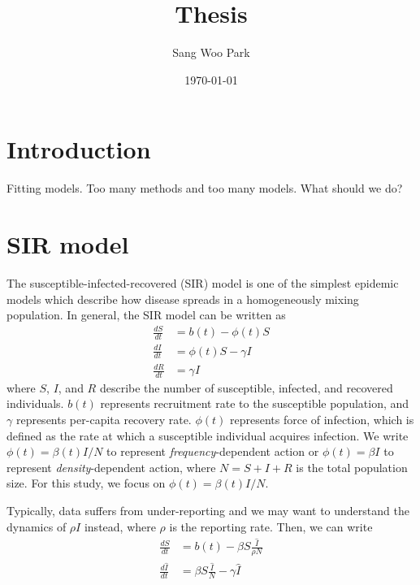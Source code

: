 \documentclass{article}
\title{Thesis}
\date{\today}
\author{Sang Woo Park}
\begin{document}
\maketitle


\section{Introduction}

Fitting models. Too many methods and too many models. What should we do?

\section{SIR model}

The susceptible-infected-recovered (SIR) model is one of the simplest epidemic models which describe how disease spreads in a homogeneously mixing population.
In general, the SIR model can be written as 
\begin{equation}
\begin{aligned}
\frac{dS}{dt} &= b(t) - \phi(t) S\\
\frac{dI}{dt} &= \phi(t) S - \gamma I\\
\frac{dR}{dt} &= \gamma I
\end{aligned}
\label{eq:sir}
\end{equation}
where $S$, $I$, and $R$ describe the number of susceptible, infected, and recovered individuals.
$b(t)$ represents recruitment rate to the susceptible population, and $\gamma$ represents per-capita recovery rate.
$\phi(t)$ represents force of infection, which is defined as the rate at which a susceptible individual acquires infection.
We write $\phi(t) = \beta(t) I/N$ to represent \textit{frequency}-dependent action or $\phi(t) = \beta I$ to represent \textit{density}-dependent action, where $N = S + I + R$ is the total population size.
For this study, we focus on $\phi(t) = \beta(t)I/N$.

Typically, data suffers from under-reporting and we may want to understand the dynamics of $\rho I$ instead, where $\rho$ is the reporting rate.
Then, we can write
\begin{equation}
\begin{aligned}
\frac{dS}{dt} &= b(t) - \beta S \frac{\hat{I}}{\rho N} \\
\frac{d\hat{I}}{dt} &= \beta S \frac{\hat{I}}{N} - \gamma \hat{I} \\
\end{aligned}
\label{eq:rhosir}
\end{equation}
\end{document}

